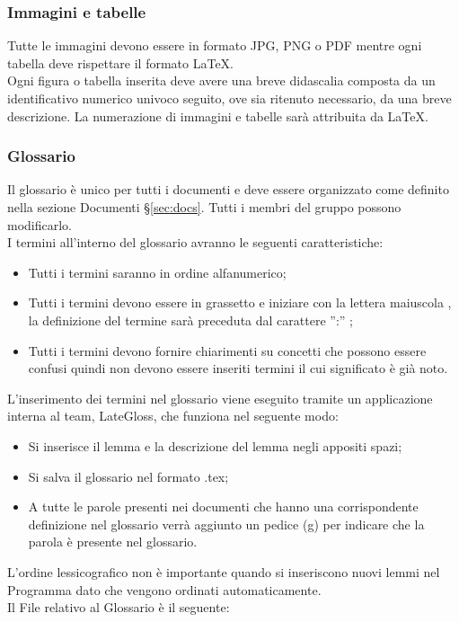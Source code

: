{{		\subsubsection{Immagini e tabelle}{
			\label{sub:img}
			Tutte le immagini devono essere in formato JPG, PNG o PDF mentre ogni tabella deve rispettare il formato \LaTeX.\\
			Ogni figura o tabella inserita deve avere una breve didascalia composta da un identificativo numerico univoco seguito, ove sia ritenuto necessario, da una breve descrizione. La numerazione di immagini e tabelle sarà attribuita da \LaTeX.\\			
			}
		}
\subsubsection{Glossario}{
 	Il glossario è unico per tutti i documenti e deve essere organizzato come definito nella sezione Documenti \S\ref{sec:docs}. Tutti i membri del gruppo possono modificarlo.\\
 	I termini all'interno del glossario avranno le seguenti caratteristiche:
 	\begin{itemize}
	 	\item Tutti i termini saranno in ordine alfanumerico;
	 	\item Tutti i termini devono essere in grassetto e iniziare con la lettera maiuscola , la definizione del termine sarà preceduta dal carattere '':'' ;
	 	\item Tutti i termini devono fornire chiarimenti su concetti che possono essere confusi quindi non devono essere inseriti termini il cui significato è già noto.
 	\end{itemize}	
      L'inserimento dei termini nel glossario viene eseguito tramite un applicazione interna al team, LateGloss, che funziona nel seguente modo:
      \begin{itemize}
	      \item Si inserisce il lemma e la descrizione del lemma negli appositi spazi;
	      \item Si salva il glossario nel formato .tex;
	      \item A tutte le parole presenti nei documenti che hanno una corrispondente definizione nel glossario  verrà aggiunto un pedice (g) per indicare che la parola è presente nel glossario.
      \end{itemize}  
   L'ordine lessicografico non è importante quando si inseriscono nuovi lemmi nel Programma dato che vengono ordinati automaticamente.\\
   Il File relativo al Glossario è il seguente: \href{run:../../Esterni/\fGlossario}{\fEscapeGlossario}
}


}
